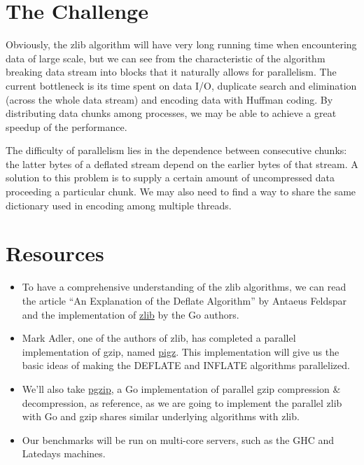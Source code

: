 \documentclass{article}
\begin{document}
\section{The Challenge}
Obviously, the zlib algorithm will have very long running time when encountering data of large scale, but we can see from the characteristic of the algorithm breaking data stream into blocks that it naturally allows for parallelism. The current bottleneck is its time spent on data I/O, duplicate search and elimination (across the whole data stream) and encoding data with Huffman coding. By distributing data chunks among processes, we may be able to achieve a great speedup of the performance.

\noindent The difficulty of parallelism lies in the dependence between consecutive chunks: the latter bytes of a deflated stream depend on the earlier bytes of that stream. A solution to this problem is to supply a certain amount of uncompressed data proceeding a particular chunk. We may also need to find a way to share the same dictionary used in encoding among multiple threads.

\section{Resources}
\begin{itemize}
    \item To have a comprehensive understanding of the zlib algorithms, we can read the article ``An Explanation of the Deflate Algorithm'' by Antaeus Feldspar and the implementation of \href{https://github.com/golang/go/tree/master/src/compress/zlib}{zlib} by the Go authors.
    \item Mark Adler, one of the authors of zlib, has completed a parallel implementation of gzip, named \href{https://zlib.net/pigz}{pigz}. This implementation will give us the basic ideas of making the DEFLATE and INFLATE algorithms parallelized.
    \item We'll also take \href{https://github.com/klauspost/pgzip}{pgzip}, a Go implementation of parallel gzip compression \& decompression, as reference, as we are going to implement the parallel zlib with Go and gzip shares similar underlying algorithms with zlib.
    \item Our benchmarks will be run on multi-core servers, such as the GHC and Latedays machines.
\end{itemize}
\end{document}
